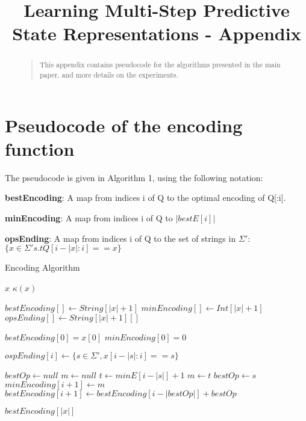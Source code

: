 \documentclass[letterpaper]{article}
\begin{document}
\title{Learning Multi-Step Predictive State Representations - Appendix}
\maketitle

\begin{abstract}
\begin{quote}
This appendix contains pseudocode for the algorithms presented in the main paper, and more details on the experiments.

\end{quote}
\end{abstract}

\section{Pseudocode of the encoding function}

The pseudocode is given in Algorithm 1, using the following notation:

\textbf{bestEncoding}: A map from indices i of Q to the optimal encoding of Q[:i].

\textbf{minEncoding}: A map from indices i of Q to $|bestE[i]|$

\textbf{opsEnding}: A map from indices i of Q to the set of strings in $\Sigma'$: $\{x \in \Sigma' s.t Q[i-|x|:i] == x\}$

\algnewcommand{}
\algnewcommand{}

\algnewcommand\INPUT{\item[\algorithmicinput]}
\algnewcommand\OUTPUT{\item[\algorithmicoutput]}

\begin{algorithm}
\caption{Encoding Algorithm}
\label{Encoding Algorithm}
\begin{algorithmic}[1]
\INPUT $x$
\OUTPUT $\kappa(x)$


\State $bestEncoding[] \gets String[|x|+1]$
\State $minEncoding[] \gets Int[|x|+1]$
\State $opsEnding[] \gets String[|x|+1][]$

\State $bestEncoding[0] = x[0]$
\State $minEncoding[0] = 0$

	 \State $ospEnding[i] \gets \{s \in \Sigma', x[i-|s|:i] == s\}$
\EndFor

	\State $bestOp \gets null$
	\State $m \gets null$ 
		\State $t \gets minE[i-|s|] + 1$
			\State $m \gets t$ 
			\State $bestOp \gets s$
		\EndIf
	\EndFor
	\State $minEncoding[i+1] \gets m$
	\State $bestEncoding[i+1] \gets bestEncoding[i-|bestOp|] + bestOp$
\EndFor

\State \Return $bestEncoding[|x|]$

\EndProcedure
\end{algorithmic}
\end{algorithm}
\end{document}
